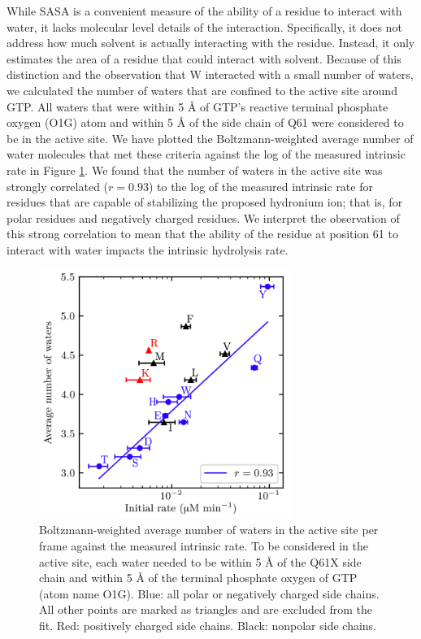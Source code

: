 While SASA is a convenient measure of the ability of a residue to interact with water, it lacks molecular level details of the interaction. 
Specifically, it does not address how much solvent is actually interacting with the residue. 
Instead, it only estimates the area of a residue that could interact with solvent. 
Because of this distinction and the observation that W interacted with a small number of waters, we calculated the number of waters that are confined to the active site around GTP. 
All waters that were within 5 \si{\angstrom} of GTP's reactive terminal phosphate oxygen (O1G) atom and within 5 \si{\angstrom} of the side chain of Q61 were considered to be in the active site. 
We have plotted the Boltzmann-weighted average number of water molecules that met these criteria against the log of the measured intrinsic rate in Figure \ref{fig:ras-scount}. 
We found that the number of waters in the active site was strongly correlated ($r = 0.93$) to the log of the measured intrinsic rate for residues that are capable of stabilizing the proposed hydronium ion; that is, for polar residues and negatively charged residues. 
We interpret the observation of this strong correlation to mean that the ability of the residue at position 61 to interact with water impacts the intrinsic hydrolysis rate.

\begin{figure}
    \center
    \includegraphics[width=3.25in]{figures-ras/Figure6.png}
    \caption{Boltzmann-weighted average number of waters in the active site per frame against the measured intrinsic rate. To be considered in the active site, each water needed to be within 5 \si{\angstrom} of the Q61X side chain and within 5 \si{\angstrom} of the terminal phosphate oxygen of GTP (atom name O1G). Blue: all polar or negatively charged side chains. All other points are marked as triangles and are excluded from the fit. Red: positively charged side chains. Black: nonpolar side chains.}
    \label{fig:ras-scount}
\end{figure}

